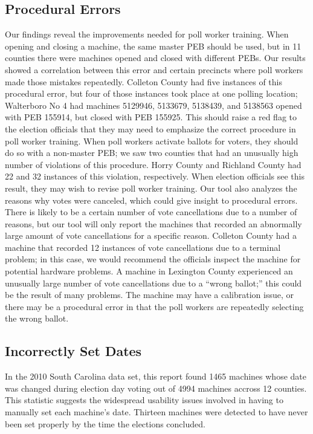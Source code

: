\subsection{Procedural Errors}
Our findings reveal the improvements needed for poll worker training.
When opening and closing a machine, the same master PEB should be used,
but in 11 counties there were machines opened and closed with different PEBs.  Our results showed a correlation between this error and certain precincts where poll workers made those mistakes repeatedly.  Colleton County had five instances of this procedural error, but four of those instances took place at one polling location; Walterboro No 4 had machines 5129946, 5133679, 5138439, and 5138563 opened with PEB 155914, but closed with PEB 155925.  This should raise a red flag to the election officials that they may need to emphasize the correct procedure in poll worker training.  When poll workers activate ballots for voters, they should do so with a non-master PEB; we saw two counties that had an unusually high number of violations of this procedure.  Horry County and Richland County had 22 and 32 instances of this violation, respectively.  When election officials see this result, they may wish to revise poll worker training.  Our tool also analyzes the reasons why votes were canceled, which could give insight to procedural errors.  There is likely to be a certain number of vote cancellations due to a number of reasons, but our tool will only report the machines that recorded an abnormally large amount of vote cancellations for a specific reason.  Colleton County had a machine that recorded 12 instances of vote cancellations due to a terminal problem; in this case, we would recommend the officials inspect the machine for potential hardware problems.  A machine in Lexington County experienced an unusually large number of vote cancellations due to a \textquotedblleft wrong ballot;'' this could be the result of many problems.  The machine may have a calibration issue, or there may be a procedural error in that the poll workers are repeatedly selecting the wrong ballot.

\subsection{Incorrectly Set Dates}
In the 2010 South Carolina data set, this report found 1465 machines whose date
was changed during election day voting out of 4994 machines accross 12
counties. This statistic suggests the widespread usability issues involved in
having to manually set each machine's date. Thirteen  machines were detected to
have never been set properly by the time the elections concluded.

